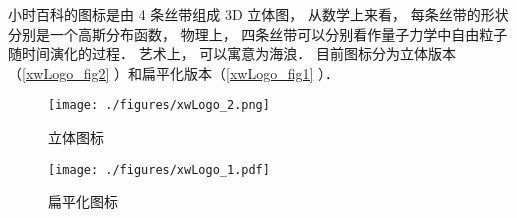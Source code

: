 

小时百科的图标是由 4 条丝带组成 3D 立体图， 从数学上来看， 每条丝带的形状分别是一个高斯分布函数， 物理上， 四条丝带可以分别看作量子力学中自由粒子随时间演化的过程． 艺术上， 可以寓意为海浪． 目前图标分为立体版本（\autoref{xwLogo_fig2} ）和扁平化版本（\autoref{xwLogo_fig1} ）．

\begin{figure}[ht]
\centering
\texttt{[image: ./figures/xwLogo\_2.png]}
\caption{立体图标} \label{xwLogo_fig2}
\end{figure}

\begin{figure}[ht]
\centering
\texttt{[image: ./figures/xwLogo\_1.pdf]}
\caption{扁平化图标} \label{xwLogo_fig1}
\end{figure}
